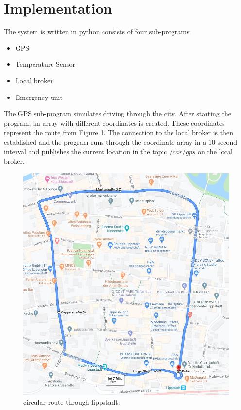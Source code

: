 \section{Implementation}
\label{sec:4}
The system is written in python consists of four sub-programs:

\begin{itemize}
    
    \item GPS
    \item Temperature Sensor
    \item Local broker
    \item Emergency unit
\end{itemize}

The GPS sub-program simulates driving through the city. After starting the program, an array with different coordinates is created. These coordinates represent the route from Figure \ref{fig:route}. The connection to the local broker is then established and the program runs through the coordinate array in a 10-second interval and publishes the current location in the topic $/car/gps$ on the local broker.

\begin{figure}
\sidecaption
\includegraphics[scale=.4]{images/images_michael/route.JPG}
\caption{circular route through lippstadt.}
\label{fig:route}
\end{figure}

